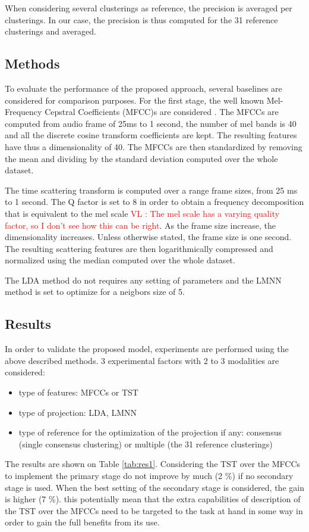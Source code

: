 \documentclass{article}
\newcommand{\vl}[1]{\textcolor{red}{VL : #1}}
\begin{document}
When considering several clusterings as reference, the precision is averaged per clusterings. In our case, the precision is thus computed for the 31 reference clusterings and averaged.

\subsection{Methods}

To evaluate the performance of the proposed approach, several baselines are considered for comparison purposes. For the first stage, the well known Mel-Frequency Cepstral Coefficients (MFCC)s are considered \cite{rabiner1993fundamentals}. The MFCCs are computed from audio frame of 25ms to 1 second, the number of mel bands is 40 and all the discrete cosine transform coefficients are kept. The resulting features have thus a dimensionality of 40. The MFCCs are then standardized by removing the mean and dividing by the standard deviation computed over the whole dataset.

The time scattering transform is computed over a range frame sizes, from 25 ms to 1 second. The Q factor is set to 8 in order to obtain a frequency decomposition that is equivalent to the mel scale \vl{The mel scale has a varying quality factor, so I don't see how this can be right}. As the frame size increase, the dimensionality increases. Unless otherwise stated, the frame size is one second. The resulting scattering features are then logarithmically compressed and normalized using the median computed over the whole dataset.

The LDA method do not requires any setting of parameters and the LMNN method is set to optimize for a neigbors size of 5.

\subsection{Results}

In order to validate the proposed model, experiments are performed using the above described methods. 3 experimental factors with 2 to 3 modalities are considered:
\begin{itemize}
  \item type of features: MFCCs or TST
  \item type of projection: LDA, LMNN
  \item type of reference for the optimization of the projection if any: consensus (single consensus clustering) or multiple (the 31 reference clusterings)
\end{itemize}
The results are shown on Table \ref{tab:res1}. Considering the TST over the MFCCs to implement the primary stage do not improve by much (2 \%) if no secondary stage is used. When the best setting of the secondary stage is considered, the gain is higher (7 \%). this potentially mean that the extra capabilities of description of the TST over the MFCCs need to be targeted to the task at hand in some way in order to gain the full benefits from its use.
\end{document}
